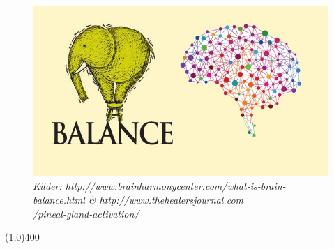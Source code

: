 \begin{figure}[H]
	\centering
	\begin{minipage}[b]{1\textwidth}
		\includegraphics{figures/Midlertidig1.JPG}
		\caption*{\tiny{\textit{Kilder: http://www.brainharmonycenter.com/what-is-brain-balance.html \& http://www.thehealersjournal.com \\ /pineal-gland-activation/}}}
	\end{minipage}
	\hfill
\end{figure}

\vspace*{\fill}

\begin{center}
\line(1,0){400}
\end{center}
